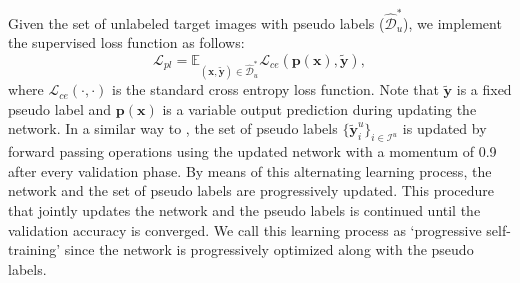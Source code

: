 \documentclass[a4paper,conference]{IEEEtran}
\begin{document}
Given the set of unlabeled target images with pseudo labels ($\hat{\mathcal{D}}_{u}^{*}$), we implement the supervised loss function as follows:
\begin{equation}
\mathcal{L}_{pl}=\mathbb{E}_{(\mathbf{x}, \widetilde{\mathbf{y}})\in\hat{\mathcal{D}}_{u}^{*}} \mathcal{L}_{ce}(\mathbf{\mathbf{p}(\mathbf{x}), \widetilde{\mathbf{y}}}),
\label{L_pl}
\end{equation}
where $\mathcal{L}_{ce}(\cdot, \cdot)$ is the standard cross entropy loss function. Note that $\mathbf{\widetilde{\mathbf{y}}}$ is a fixed pseudo label and $\mathbf{p}(\mathbf{x})$ is a variable output prediction during updating the network. In a similar way to \cite{tanaka2018joint}, the set of pseudo labels $\{\mathbf{\widetilde{\mathbf{y}}}_{i}^{u}\}_{i\in\mathcal{I}^{u}}$ is updated by forward passing operations using the updated network with a momentum of 0.9 after every validation phase. By means of this alternating learning process, the network and the set of pseudo labels are progressively updated. This procedure that jointly updates the network and the pseudo labels is continued until the validation accuracy is converged. We call this learning process as `progressive self-training' since the network is progressively optimized along with the pseudo labels.
\end{document}
